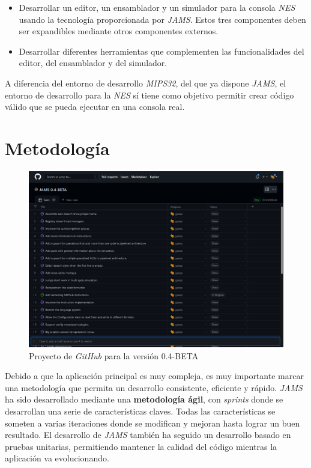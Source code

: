 \begin{itemize}
    \item Desarrollar un editor, un ensamblador y un simulador
    para la consola \textit{NES} usando la tecnología
    proporcionada por \textit{JAMS}.
    Estos tres componentes deben ser expandibles mediante otros componentes externos.
    \item Desarrollar diferentes herramientas que complementen las funcionalidades
    del editor, del ensamblador y del simulador.
\end{itemize}

A diferencia del entorno de desarrollo \textit{MIPS32}, del
  que ya dispone \emph{JAMS}, el entorno
de desarrollo para la \textit{NES} sí tiene como objetivo permitir crear
código válido que se pueda ejecutar en una consola real.


\section{Metodología}\label{sec:metodologia}

\begin{figure}[h]
    \centering
    \includegraphics[width=\textwidth]{images/introduction/github}
    \caption{Proyecto de \textit{GitHub} para la versión 0.4-BETA}
    \label{fig:introduccion-github}
\end{figure}

Debido a que la aplicación principal es muy compleja,
es muy importante marcar una metodología que permita un
desarrollo consistente, eficiente y rápido.
\textit{JAMS} ha sido desarrollado mediante una \textbf{metodología ágil},
con \textit{sprints} donde se desarrollan una serie de características claves.
Todas las características se someten a varias iteraciones donde se modifican y mejoran hasta lograr un
buen resultado.
El desarrollo de \textit{JAMS} también ha seguido un desarrollo
basado en pruebas unitarias, permitiendo mantener la calidad del
código mientras la aplicación va evolucionando.

